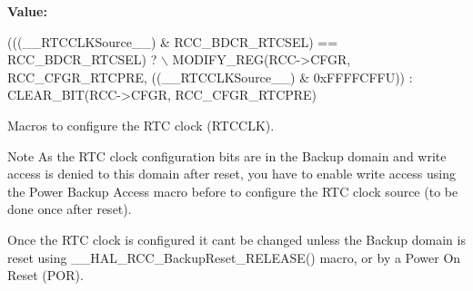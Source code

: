 {\bfseries Value\+:}
\begin{DoxyCode}
(((\_\_RTCCLKSource\_\_) & RCC\_BDCR\_RTCSEL) == RCC\_BDCR\_RTCSEL) ?    \(\backslash\)
                                                 MODIFY\_REG(RCC->CFGR, RCC\_CFGR\_RTCPRE, ((\_\_RTCCLKSource\_\_)
       & 0xFFFFCFFU)) : CLEAR\_BIT(RCC->CFGR, RCC\_CFGR\_RTCPRE)
\end{DoxyCode}


Macros to configure the R\+TC clock (R\+T\+C\+C\+LK). 

\begin{DoxyNote}{Note}
As the R\+TC clock configuration bits are in the Backup domain and write access is denied to this domain after reset, you have to enable write access using the Power Backup Access macro before to configure the R\+TC clock source (to be done once after reset). 

Once the R\+TC clock is configured it can\textquotesingle{}t be changed unless the Backup domain is reset using \+\_\+\+\_\+\+H\+A\+L\+\_\+\+R\+C\+C\+\_\+\+Backup\+Reset\+\_\+\+R\+E\+L\+E\+A\+S\+E() macro, or by a Power On Reset (P\+OR). 
\end{DoxyNote}

